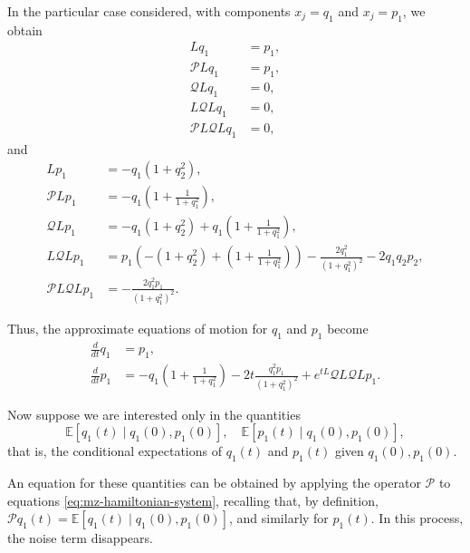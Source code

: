 \documentclass[12pt]{article}
\begin{document}
In the particular case considered, with components $x_j = q_1$ and $x_j = p_1$, we obtain
\begin{align*}
	Lq_1                         & = p_1, \\
	\mathcal{P}Lq_1              & = p_1, \\
	\mathcal{Q}Lq_1              & = 0,   \\
	L\mathcal{Q}Lq_1             & = 0,   \\
	\mathcal{P}L\mathcal{Q}L q_1 & = 0,   
\end{align*}
and
\begin{align*}
	Lp_1                        & = -q_1(1 + q_2^2),                                                                                                      \\
	\mathcal{P}Lp_1             & = -q_1\left(1 + \frac{1}{1 + q_1^2}\right),                                                                             \\
	\mathcal{Q}Lp_1             & = -q_1(1 + q_2^2) + q_1\left(1 + \frac{1}{1 + q_1^2}\right),                                                            \\
	L\mathcal{Q}Lp_1            & = p_1\left(- (1 + q_2^2) + \left(1 + \frac{1}{1 + q_1^2} \right) \right) - \frac{2q_1^2}{(1 + q_1^2)^2} - 2q_1 q_2 p_2, \\
	\mathcal{P}L\mathcal{Q}Lp_1 & = -\frac{2q_1^2 p_1}{(1 + q_1^2)^2}.                                                                                    
\end{align*}

Thus, the approximate equations of motion for $q_1$ and $p_1$ become
\begin{align}
	\frac{d}{dt} q_1 & = p_1, \nonumber                                                                                                     \\
	\frac{d}{dt} p_1 & = -q_1\left(1 + \frac{1}{1 + q_1^2}\right) - 2t\frac{q_1^2 p_1}{(1 + q_1^2)^2} + e^{tL}\mathcal{Q}L\mathcal{Q}L p_1. 
	\label{eq:mz-hamiltonian-system}
\end{align}

Now suppose we are interested only in the quantities
\begin{equation*}
	\mathbb{E}[q_1(t) \mid q_1(0), p_1(0)], \quad \mathbb{E}[p_1(t) \mid q_1(0), p_1(0)],
\end{equation*}
that is, the conditional expectations of $q_1(t)$ and $p_1(t)$ given $q_1(0), p_1(0)$.

An equation for these quantities can be obtained by applying the operator $\mathcal{P}$ to equations \eqref{eq:mz-hamiltonian-system}, recalling that, by definition, $\mathcal{P}q_1(t) = \mathbb{E}[q_1(t) \mid q_1(0), p_1(0)]$, and similarly for $p_1(t)$. In this process, the noise term disappears.
\end{document}
